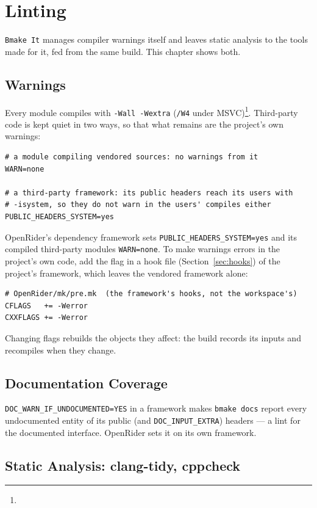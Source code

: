 \documentclass[11pt]{report}
\newcommand{\reqfoot}[1]{\footnote{\footnotesize\seqsplit{#1}}}
\begin{document}
\chapter{Linting}
\label{ch:linting}

\texttt{Bmake It} manages compiler warnings itself and leaves static
analysis to the tools made for it, fed from the same build. This
chapter shows both.

\section{Warnings}

Every module compiles with \verb|-Wall -Wextra| (\verb|/W4| under
MSVC)\reqfoot{REQ-warn-macro-req}. Third-party code is kept quiet in two
ways, so that what remains are the project's own warnings:
\begin{lstlisting}[language=bmake]
# a module compiling vendored sources: no warnings from it
WARN=none

# a third-party framework: its public headers reach its users with
# -isystem, so they do not warn in the users' compiles either
PUBLIC_HEADERS_SYSTEM=yes
\end{lstlisting}
OpenRider's dependency framework sets \verb|PUBLIC_HEADERS_SYSTEM=yes|
and its compiled third-party modules \verb|WARN=none|. To make warnings
errors in the project's own code, add the flag in a hook file
(Section~\ref{sec:hooks}) of the project's framework, which leaves the
vendored framework alone:
\begin{lstlisting}[language=bmake]
# OpenRider/mk/pre.mk  (the framework's hooks, not the workspace's)
CFLAGS   += -Werror
CXXFLAGS += -Werror
\end{lstlisting}
Changing flags rebuilds the objects they affect: the build records its
inputs and recompiles when they change.

\section{Documentation Coverage}

\verb|DOC_WARN_IF_UNDOCUMENTED=YES| in a framework makes
\verb|bmake docs| report every undocumented entity of its public (and
\verb|DOC_INPUT_EXTRA|) headers --- a lint for the documented
interface. OpenRider sets it on its own framework.

\section{Static Analysis: clang-tidy, cppcheck}
\end{document}

